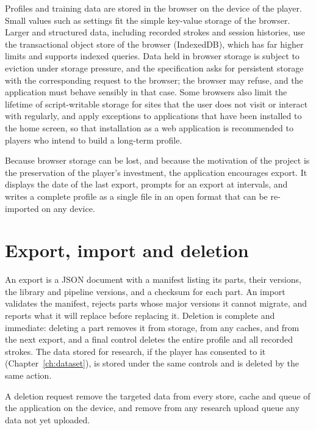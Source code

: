 Profiles and training data are stored in the browser on the device of the player. Small values such as settings fit the simple key-value storage of the browser. Larger and structured data, including recorded strokes and session histories, use the transactional object store of the browser (IndexedDB), which has far higher limits and supports indexed queries. Data held in browser storage is subject to eviction under storage pressure, and the specification asks for persistent storage with the corresponding request to the browser; the browser may refuse, and the application must behave sensibly in that case.\evD{} Some browsers also limit the lifetime of script-writable storage for sites that the user does not visit or interact with regularly, and apply exceptions to applications that have been installed to the home screen, so that installation as a web application is recommended to players who intend to build a long-term profile.\evD{}

Because browser storage can be lost, and because the motivation of the project is the preservation of the player's investment, the application encourages export. It displays the date of the last export, prompts for an export at intervals, and writes a complete profile as a single file in an open format that can be re-imported on any device.

\section{Export, import and deletion}

An export is a JSON document with a manifest listing its parts, their versions, the library and pipeline versions, and a checksum for each part. An import validates the manifest, rejects parts whose major versions it cannot migrate, and reports what it will replace before replacing it. Deletion is complete and immediate: deleting a part removes it from storage, from any caches, and from the next export, and a final control deletes the entire profile and all recorded strokes. The data stored for research, if the player has consented to it (Chapter~\ref{ch:dataset}), is stored under the same controls and is deleted by the same action.

\begin{requirement}\label{req:deletion}
A deletion request \must{} remove the targeted data from every store, cache and queue of the application on the device, and \must{} remove from any research upload queue any data not yet uploaded.\evS
\end{requirement}

